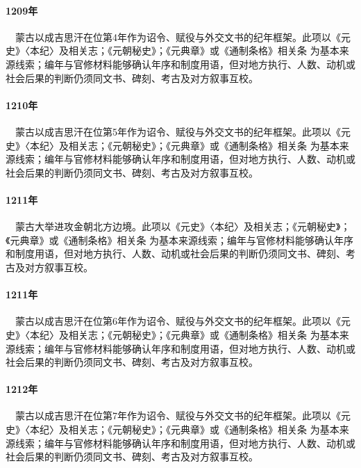 \paragraph{1209年}　蒙古以成吉思汗在位第4年作为诏令、赋役与外交文书的纪年框架。此项以《元史》〈本纪〉及相关志；《元朝秘史》；《元典章》或《通制条格》相关条 为基本来源线索；编年与官修材料能够确认年序和制度用语，但对地方执行、人数、动机或社会后果的判断仍须同文书、碑刻、考古及对方叙事互校。

\paragraph{1210年}　蒙古以成吉思汗在位第5年作为诏令、赋役与外交文书的纪年框架。此项以《元史》〈本纪〉及相关志；《元朝秘史》；《元典章》或《通制条格》相关条 为基本来源线索；编年与官修材料能够确认年序和制度用语，但对地方执行、人数、动机或社会后果的判断仍须同文书、碑刻、考古及对方叙事互校。

\paragraph{1211年}　蒙古大举进攻金朝北方边境。此项以《元史》〈本纪〉及相关志；《元朝秘史》；《元典章》或《通制条格》相关条 为基本来源线索；编年与官修材料能够确认年序和制度用语，但对地方执行、人数、动机或社会后果的判断仍须同文书、碑刻、考古及对方叙事互校。

\paragraph{1211年}　蒙古以成吉思汗在位第6年作为诏令、赋役与外交文书的纪年框架。此项以《元史》〈本纪〉及相关志；《元朝秘史》；《元典章》或《通制条格》相关条 为基本来源线索；编年与官修材料能够确认年序和制度用语，但对地方执行、人数、动机或社会后果的判断仍须同文书、碑刻、考古及对方叙事互校。

\paragraph{1212年}　蒙古以成吉思汗在位第7年作为诏令、赋役与外交文书的纪年框架。此项以《元史》〈本纪〉及相关志；《元朝秘史》；《元典章》或《通制条格》相关条 为基本来源线索；编年与官修材料能够确认年序和制度用语，但对地方执行、人数、动机或社会后果的判断仍须同文书、碑刻、考古及对方叙事互校。

